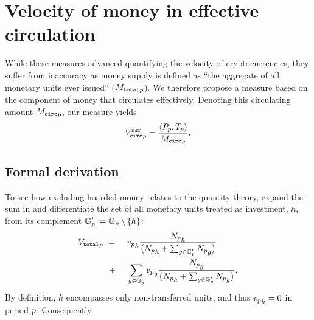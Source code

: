 \section{Velocity of money in effective circulation}
\label{sec:newmeas}%
%
While these measures advanced quantifying the velocity of cryptocurrencies,
they suffer from inaccuracy as money supply is defined as ``the aggregate of
all monetary units ever issued'' (${{M_{\mathtt{total}}}_{p}}$).  We therefore propose a
measure based on the component of money that circulates effectively. %
Denoting this circulating amount ${{M_{\mathtt{circ}}}_{p}}$, our measure yields
\begin{align}%
  \label{eq:vcirc_concept}
  \VCircEstP = \frac{\langle\Pp,\Tp\rangle}{\MCircP}.%
\end{align}%
%

\subsection{Formal derivation}
\label{sec:formal-derivation}

To see how excluding hoarded money relates to the quantity theory, expand the
sum in  and differentiate the set of all monetary units
treated as investment, $h$, from its complement
${{\mathbb{G}}'_{p}}\coloneqq{{\mathbb{G}}_{p}}\setminus\{h\}$:
\begin{alignat}{4}%
  \VTotalP%
  \ & = &\ & \vp_h \frac{%
    \Np_h%
  }{%
    \bigl( \Np_h+\sum_{g\in\GStrokeP} \Np_g \bigr)%
  }\\%
  \ & \ + &\ & \sum_{g\in\GStrokeP} \vp_g \frac{%
    \Np_g%
  }{%
    \bigl( \Np_h+\sum_{g\in\GStrokeP} \Np_g \bigr)%
  }.\nonumber%
\end{alignat}%
%
By definition, $h$ encompasses only non-transferred units, and thus ${v_{p}}_h=0$
in period ${p}$. Consequently %

